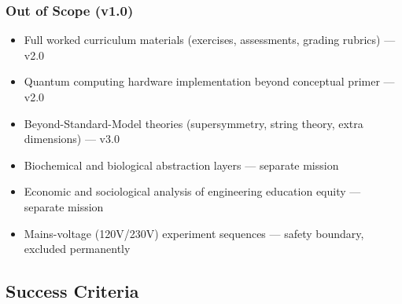\documentclass[11pt,letterpaper]{article}
\begin{document}
\subsubsection{Out of Scope (v1.0)}

\begin{itemize}[leftmargin=*]
  \item Full worked curriculum materials (exercises, assessments, grading rubrics) --- v2.0
  \item Quantum computing hardware implementation beyond conceptual primer --- v2.0
  \item Beyond-Standard-Model theories (supersymmetry, string theory, extra dimensions) --- v3.0
  \item Biochemical and biological abstraction layers --- separate mission
  \item Economic and sociological analysis of engineering education equity --- separate mission
  \item Mains-voltage (120V/230V) experiment sequences --- safety boundary, excluded permanently
\end{itemize}

\subsection{Success Criteria}
\end{document}
